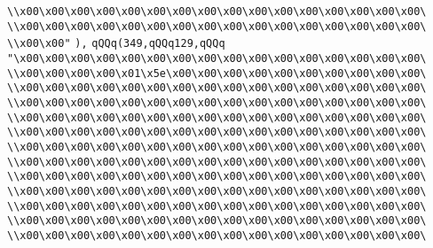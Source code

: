 \verb|\\x00\x00\x00\x00\x00\x00\x00\x00\x00\x00\x00\x00\x00\x00\x00\x00\|\newline
\verb|\\x00\x00\x00\x00\x00\x00\x00\x00\x00\x00\x00\x00\x00\x00\x00\x00\|\newline
\verb|\\x00\x00"|\newline
\verb|),|\newline
\verb|qQQq(349,qQQq129,qQQq|\newline
\verb|"\x00\x00\x00\x00\x00\x00\x00\x00\x00\x00\x00\x00\x00\x00\x00\x00\|\newline
\verb|\\x00\x00\x00\x00\x01\x5e\x00\x00\x00\x00\x00\x00\x00\x00\x00\x00\|\newline
\verb|\\x00\x00\x00\x00\x00\x00\x00\x00\x00\x00\x00\x00\x00\x00\x00\x00\|\newline
\verb|\\x00\x00\x00\x00\x00\x00\x00\x00\x00\x00\x00\x00\x00\x00\x00\x00\|\newline
\verb|\\x00\x00\x00\x00\x00\x00\x00\x00\x00\x00\x00\x00\x00\x00\x00\x00\|\newline
\verb|\\x00\x00\x00\x00\x00\x00\x00\x00\x00\x00\x00\x00\x00\x00\x00\x00\|\newline
\verb|\\x00\x00\x00\x00\x00\x00\x00\x00\x00\x00\x00\x00\x00\x00\x00\x00\|\newline
\verb|\\x00\x00\x00\x00\x00\x00\x00\x00\x00\x00\x00\x00\x00\x00\x00\x00\|\newline
\verb|\\x00\x00\x00\x00\x00\x00\x00\x00\x00\x00\x00\x00\x00\x00\x00\x00\|\newline
\verb|\\x00\x00\x00\x00\x00\x00\x00\x00\x00\x00\x00\x00\x00\x00\x00\x00\|\newline
\verb|\\x00\x00\x00\x00\x00\x00\x00\x00\x00\x00\x00\x00\x00\x00\x00\x00\|\newline
\verb|\\x00\x00\x00\x00\x00\x00\x00\x00\x00\x00\x00\x00\x00\x00\x00\x00\|\newline
\verb|\\x00\x00\x00\x00\x00\x00\x00\x00\x00\x00\x00\x00\x00\x00\x00\x00\|\newline
